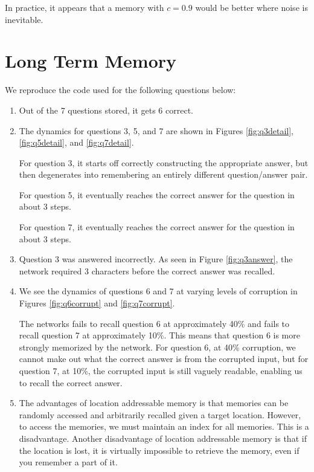 \documentclass[11pt, oneside]{article}
\begin{document}
In practice, it appears that a memory with $c = 0.9$ would be better where noise is inevitable.

\section{Long Term Memory}

We reproduce the code used for the following questions below:


\begin{enumerate}
  \item Out of the 7 questions stored, it gets 6 correct.

  \item The dynamics for questions 3, 5, and 7 are shown in Figures \ref{fig:q3detail}, \ref{fig:q5detail}, and \ref{fig:q7detail}.

  For question 3, it starts off correctly constructing the appropriate answer, but then degenerates into remembering an entirely different question/answer pair.

  For question 5, it eventually reaches the correct answer for the question in about 3 steps.

  For question 7, it eventually reaches the correct answer for the question in about 3 steps.

  \item Question 3 was answered incorrectly. As seen in Figure \ref{fig:q3answer}, the network required 3 characters before the correct answer was recalled.

  \item We see the dynamics of questions 6 and 7 at varying levels of corruption in Figures \ref{fig:q6corrupt} and \ref{fig:q7corrupt}.

  The networks fails to recall question 6 at approximately 40\% and fails to recall question 7 at approximately 10\%. This means that question 6 is more strongly memorized by the network. For question 6, at 40\% corruption, we cannot make out what the correct answer is from the corrupted input, but for question 7, at 10\%, the corrupted input is still vaguely readable, enabling us to recall the correct answer.

  \item The advantages of location addressable memory is that memories can be randomly accessed and arbitrarily recalled given a target location. However, to access the memories, we must maintain an index for all memories. This is a disadvantage. Another disadvantage of location addressable memory is that if the location is lost, it is virtually impossible to retrieve the memory, even if you remember a part of it.


\end{enumerate}
\end{document}
